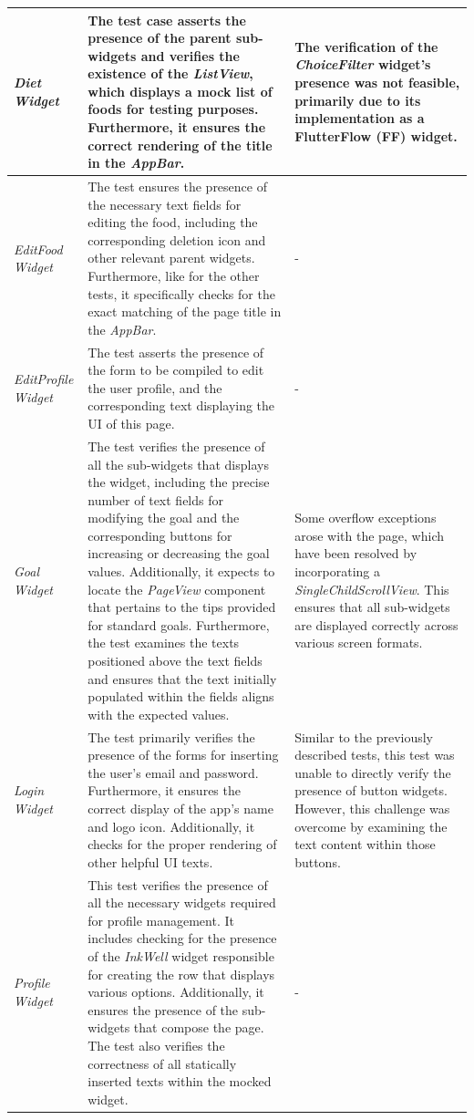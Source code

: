 \documentclass{Configuration_Files/PoliMi3i_thesis}
\begin{document}
\begin{longtable}{|m{3cm}|m{6cm}|m{5cm}|}
    \hline
    \textit{Diet Widget} & The test case asserts the presence of the parent sub-widgets and verifies the existence of the \textit{ListView}, which displays a mock list of foods for testing purposes. Furthermore, it ensures the correct rendering of the title in the \textit{AppBar}. & The verification of the \textit{ChoiceFilter} widget's presence was not feasible, primarily due to its implementation as a FlutterFlow (FF) widget. \\
    \hline
    \textit{EditFood Widget} & The test ensures the presence of the necessary text fields for editing the food, including the corresponding deletion icon and other relevant parent widgets. Furthermore, like for the other tests, it specifically checks for the exact matching of the page title in the \textit{AppBar}. & - \\
    \hline
    \textit{EditProfile Widget} & The test asserts the presence of the form to be compiled to edit the user profile, and the corresponding text displaying the UI of this page. &  - \\
    \hline
    \textit{Goal Widget} &  The test verifies the presence of all the sub-widgets that displays the widget, including the precise number of text fields for modifying the goal and the corresponding buttons for increasing or decreasing the goal values. Additionally, it expects to locate the \textit{PageView} component that pertains to the tips provided for standard goals. Furthermore, the test examines the texts positioned above the text fields and ensures that the text initially populated within the fields aligns with the expected values. & Some overflow exceptions arose with the page, which have been resolved by incorporating a \textit{SingleChildScrollView}. This ensures that all sub-widgets are displayed correctly across various screen formats. \\
    \hline
    \textit{Login Widget} & The test primarily verifies the presence of the forms for inserting the user's email and password. Furthermore, it ensures the correct display of the app's name and logo icon. Additionally, it checks for the proper rendering of other helpful UI texts. & Similar to the previously described tests, this test was unable to directly verify the presence of button widgets. However, this challenge was overcome by examining the text content within those buttons. \\
    \hline
    \textit{Profile Widget} & This test verifies the presence of all the necessary widgets required for profile management. It includes checking for the presence of the \textit{InkWell} widget responsible for creating the row that displays various options. Additionally, it ensures the presence of the sub-widgets that compose the page. The test also verifies the correctness of all statically inserted texts within the mocked widget. & - \\

\end{longtable}
\end{document}
